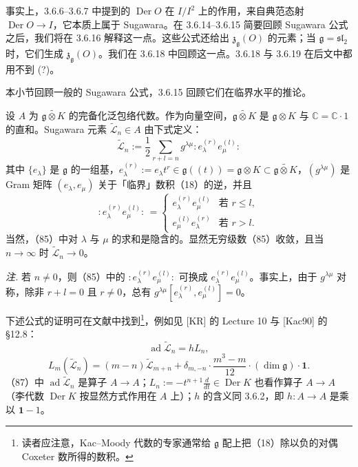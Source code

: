 
 事实上，3.6.6--3.6.7 中提到的 $\operatorname{Der} O$ 在 $I/I^{2}$ 上的作用，来自典范态射 $\operatorname{Der} O \to I$，它本质上属于 Sugawara。在 3.6.14--3.6.15 简要回顾 Sugawara 公式之后，我们将在 3.6.16 解释这一点。这些公式还给出 $\mathfrak{z}_{\mathfrak{g}}(O)$ 的元素；当 $\mathfrak{g} = \mathfrak{sl}_{2}$ 时，它们生成 $\mathfrak{z}_{\mathfrak{g}}(O)$。我们在 3.6.18 中回顾这一点。3.6.18 与 3.6.19 在后文中都用不到 (?)。

 本小节回顾一般的 Sugawara 公式，3.6.15 回顾它们在临界水平的推论。

设 $A$ 为 $\widetilde{\mathfrak{g}\otimes K}$ 的完备化泛包络代数。作为向量空间，$\widetilde{\mathfrak{g}\otimes K}$ 是 $\mathfrak{g}\otimes K$ 与 $\mathbb{C} = \mathbb{C}\cdot 1$ 的直和。Sugawara 元素 $\widetilde{\mathcal{L}}_{n} \in A$ 由下式定义：
\begin{equation}\tag{85}
\widetilde{\mathcal{L}}_{n} := \frac{1}{2}\sum_{r+l=n} g^{\lambda\mu} :e_{\lambda}^{(r)}e_{\mu}^{(l)}:
\end{equation}
其中 $\{e_{\lambda}\}$ 是 $\mathfrak{g}$ 的一组基，$e_{\lambda}^{(r)} := e_{\lambda}t^{r} \in \mathfrak{g}((t)) = \mathfrak{g}\otimes K \subset \widetilde{\mathfrak{g}\otimes K}$，$(g^{\lambda\mu})$ 是 Gram 矩阵 $(e_{\lambda}, e_{\mu})$ 关于「临界」数积（18）的逆，并且
\begin{equation}\tag{86}
:e_{\lambda}^{(r)}e_{\mu}^{(l)}: \,=
\begin{cases}
e_{\lambda}^{(r)}e_{\mu}^{(l)} & \text{若 } r \le l,\\
e_{\mu}^{(l)}e_{\lambda}^{(r)} & \text{若 } r > l.
\end{cases}
\end{equation}
当然，（85）中对 $\lambda$ 与 $\mu$ 的求和是隐含的。显然无穷级数（85）收敛，且当 $n \to \infty$ 时 $\widetilde{\mathcal{L}}_{n} \to 0$。

\emph{注.} 若 $n \ne 0$，则（85）中的 $:e_{\lambda}^{(r)}e_{\mu}^{(l)}:$ 可换成 $e_{\lambda}^{(r)}e_{\mu}^{(l)}$。事实上，由于 $g^{\lambda\mu}$ 对称，除非 $r + l = 0$ 且 $r \ne 0$，总有 $g^{\lambda\mu}[e_{\lambda}^{(r)}, e_{\mu}^{(l)}] = 0$。


下述公式的证明可在文献中找到\footnote{读者应注意，Kac--Moody 代数的专家通常给 $\mathfrak{g}$ 配上把（18）除以负的对偶 Coxeter 数所得的数积。}，例如见 [KR] 的 Lecture 10 与 [Kac90] 的 §12.8：
\begin{equation}\tag{87}
\operatorname{ad}\widetilde{\mathcal{L}}_{n} = hL_{n},
\end{equation}
\begin{equation}\tag{88}
L_{m}(\widetilde{\mathcal{L}}_{n}) = (m-n)\widetilde{\mathcal{L}}_{m+n} + \delta_{m,-n}\cdot\frac{m^{3}-m}{12}\cdot(\dim\mathfrak{g})\cdot\mathbf{1}.
\end{equation}
（87）中 $\operatorname{ad}\widetilde{\mathcal{L}}_{n}$ 是算子 $A \to A$；$L_{n} := -t^{n+1}\frac{d}{dt} \in \operatorname{Der} K$ 也看作算子 $A \to A$（李代数 $\operatorname{Der} K$ 按显然方式作用在 $A$ 上）；$h$ 的含义同 3.6.2，即 $h: A \to A$ 是乘以 $\mathbf{1} - 1$。

